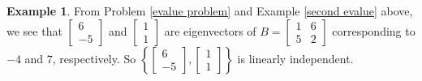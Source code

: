 \documentclass[12pt,letterpaper]{book}
\numberwithin{equation}{section}
\theoremstyle{definition}
\newtheorem{example}[thm]{\textbf{Example}}
\begin{document}
\begin{example} From Problem \ref{evalue problem} and Example \ref{second evalue} above, we see that $\left[\begin{array}{r} 6
\\ -5 \end{array}\right]$ and $\left[\begin{array}{r} 1 \\ 1 \end{array}\right]$ are eigenvectors of $B=\left[\begin{array}{rr} 1 & 6 \\ 5 & 2 \end{array}\right]$ corresponding to $-4$ and $7$, respectively. So $\left\{\left[\begin{array}{r} 6
\\ -5 \end{array}\right],\left[\begin{array}{r} 1 \\ 1 \end{array}\right]\right\}$ is linearly independent.
\end{example}
\end{document}
